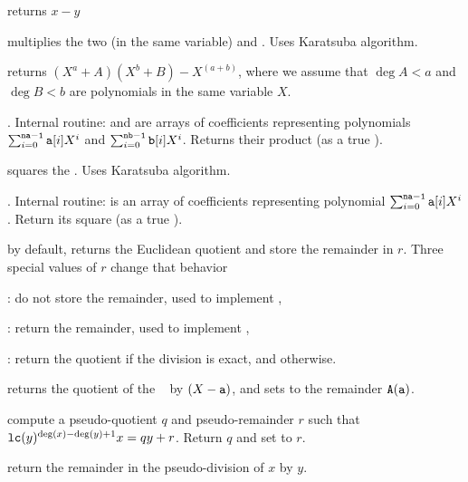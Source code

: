 
 returns $x-y$

 multiplies the two  (in the same
variable)  and . Uses Karatsuba algorithm.

returns $(X^a + A)(X^b + B) - X^(a+b)$, where we assume that $\deg A < a$
and $\deg B < b$ are polynomials in the same variable $X$.

. Internal routine:
 and  are arrays of coefficients representing polynomials
$\sum_{i = 0}^{{\tt na-1}} {\tt a}[i] X^i$ and
$\sum_{i = 0}^{{\tt nb-1}} {\tt b}[i] X^i$. Returns their product (as a true
).

 squares the  . Uses Karatsuba
algorithm.

. Internal routine:
 is an array of coefficients representing polynomial
$\sum_{i = 0}^{{\tt na-1}} {\tt a}[i] X^i$. Return its square (as a true
).

 by default, returns the Euclidean
quotient and store the remainder in $r$. Three special values of $r$ change
that behavior
\item {}: do not store the remainder, used to implement ,

\item {}: return the remainder, used to implement ,

\item {}: return the quotient if the division is exact, and
 otherwise.


 returns the
quotient of the ~ by $(X - {\tt a})$, and sets  to the
remainder ${\tt A}({\tt a})$.


 compute a pseudo-quotient
$q$ and pseudo-remainder $r$ such that ${\tt lc}(y)^{\deg(x) - \deg(y) + 1}x
= qy + r$. Return $q$ and set  to $r$.

 return the remainder
in the pseudo-division of $x$ by $y$.

